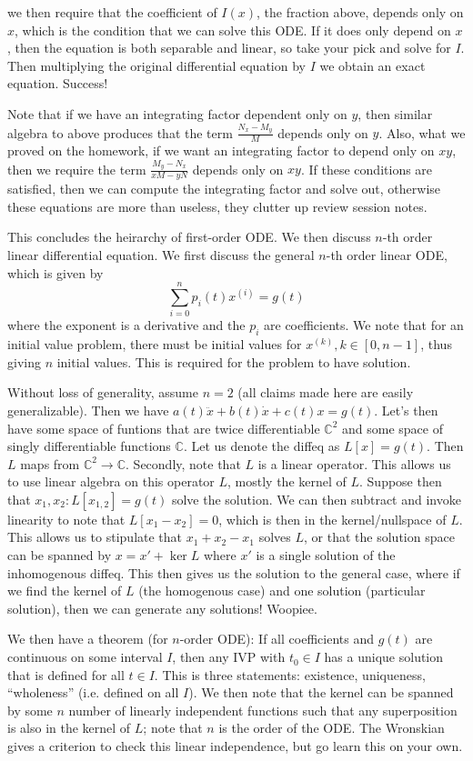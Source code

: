 \documentclass[10pt]{article}
\begin{document}
we then require that the coefficient of $I(x)$, the fraction above, depends only on $x$, which is the condition that we can solve this ODE. If it does only depend on $x$, then the equation is both separable and linear, so take your pick and solve for $I$. Then multiplying the original differential equation by $I$ we obtain an exact equation. Success!

Note that if we have an integrating factor dependent only on $y$, then similar algebra to above produces that the term $\frac{N_x - M_y}{M}$ depends only on $y$. Also, what we proved on the homework, if we want an integrating factor to depend only on $xy$, then we require the term $\frac{M_y - N_x}{xM - yN}$ depends only on $xy$. If these conditions are satisfied, then we can compute the integrating factor and solve out, otherwise these equations are more than useless, they clutter up review session notes.

This concludes the heirarchy of first-order ODE. We then discuss $n$-th order linear differential equation. We first discuss the general $n$-th order linear ODE, which is given by
$$\sum_{i=0}^n p_i(t) x^{(i)} = g(t)$$
where the exponent is a derivative and the $p_i$ are coefficients. We note that for an initial value problem, there must be initial values for $x^{(k)}, k \in [0,n-1]$, thus giving $n$ initial values. This is required for the problem to have solution.

Without loss of generality, assume $n=2$ (all claims made here are easily generalizable). Then we have $a(t)\ddot{x} + b(t)\dot{x} + c(t)x = g(t)$. Let's then have some space of funtions that are twice differentiable $\mathbb{C}^2$ and some space of singly differentiable functions $\mathbb{C}$. Let us denote the diffeq as $L[x] = g(t)$. Then $L$ maps from $\mathbb{C}^2 \to \mathbb{C}$. Secondly, note that $L$ is a linear operator. This allows us to use linear algebra on this operator $L$, mostly the kernel of $L$. Suppose then that $x_1,x_2: L[x_{1,2}] = g(t)$ solve the solution. We can then subtract and invoke linearity to note that $L[x_1 - x_2] = 0$, which is then in the kernel/nullspace of $L$. This allows us to stipulate that $x_1 + x_2 - x_1$ solves $L$, or that the solution space can be spanned by $x = x' + \ker L$ where $x'$ is a single solution of the inhomogenous diffeq. This then gives us the solution to the general case, where if we find the kernel of $L$ (the homogenous case) and one solution (particular solution), then we can generate any solutions! Woopiee.

We then have a theorem (for $n$-order ODE): If all coefficients and $g(t)$ are continuous on some interval $I$, then any IVP with $t_0 \in I$ has a unique solution that is defined for all $t \in I$. This is three statements: existence, uniqueness, ``wholeness'' (i.e. defined on all $I$). We then note that the kernel can be spanned by some $n$ number of linearly independent functions such that any superposition is also in the kernel of $L$; note that $n$ is the order of the ODE. The Wronskian gives a criterion to check this linear independence, but go learn this on your own.
\end{document}
